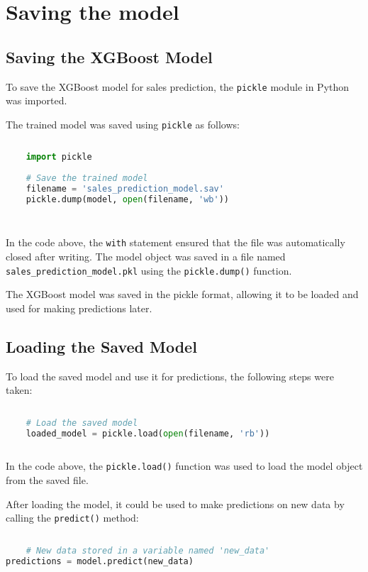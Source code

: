 \section{Saving the model}

\subsection{Saving the XGBoost Model}

To save the XGBoost model for sales prediction, the \texttt{pickle} module in Python was imported.

The trained model was saved using \texttt{pickle} as follows:

\begin{lstlisting}[language=Python]
	
	import pickle
	
	# Save the trained model
	filename = 'sales_prediction_model.sav'
	pickle.dump(model, open(filename, 'wb'))
	
	
\end{lstlisting}

In the code above, the \texttt{with} statement ensured that the file was automatically closed after writing. The model object was saved in a file named \texttt{sales\_prediction\_model.pkl} using the \texttt{pickle.dump()} function.

The XGBoost model was saved in the pickle format, allowing it to be loaded and used for making predictions later.

\subsection{Loading the Saved Model}

To load the saved model and use it for predictions, the following steps were taken:

\begin{lstlisting}[language=Python]
	
	# Load the saved model
	loaded_model = pickle.load(open(filename, 'rb'))
	
\end{lstlisting}

In the code above, the \texttt{pickle.load()} function was used to load the model object from the saved file.

After loading the model, it could be used to make predictions on new data by calling the \texttt{predict()} method:

\begin{lstlisting}[language=Python]
	
	# New data stored in a variable named 'new_data'
predictions = model.predict(new_data)
	
\end{lstlisting}

